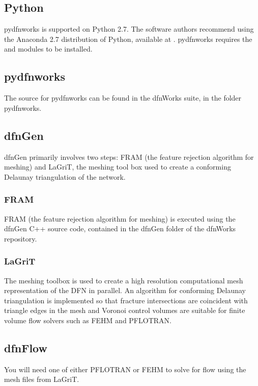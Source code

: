 \documentclass[letterpaper,10pt,english]{sphinxmanual}
\begin{document}
\subsection{Python}
\label{\detokenize{intro:python}}
pydfnworks is supported on Python 2.7. The software authors recommend using
the Anaconda 2.7 distribution of Python, available at .
pydfnworks requires the  and  modules to be installed.


\subsection{pydfnworks}
\label{\detokenize{intro:pydfnworks}}
The source for pydfnworks can be found in the dfnWorks suite, in the folder
pydfnworks.


\subsection{dfnGen}
\label{\detokenize{intro:dfngen}}
dfnGen primarily involves two steps: FRAM (the feature rejection algorithm for meshing) and LaGriT, the meshing tool box used to create a
conforming Delaunay triangulation of the network.


\subsubsection{FRAM}
\label{\detokenize{intro:fram}}
FRAM (the feature rejection algorithm for meshing) is executed using the
dfnGen C++ source code, contained in the dfnGen folder of the dfnWorks repository.


\subsubsection{LaGriT}
\label{\detokenize{intro:lagrit}}
The  meshing toolbox is used to create a high resolution computational
mesh representation of the DFN in parallel. An algorithm for conforming
Delaunay triangulation is implemented so that fracture intersections are
coincident with triangle edges in the mesh and Voronoi control volumes are
suitable for finite volume flow solvers such as FEHM and PFLOTRAN.


\subsection{dfnFlow}
\label{\detokenize{intro:dfnflow}}\label{\detokenize{intro:id1}}
You will need one of either PFLOTRAN or FEHM to solve for flow using the
mesh files from LaGriT.
\end{document}
